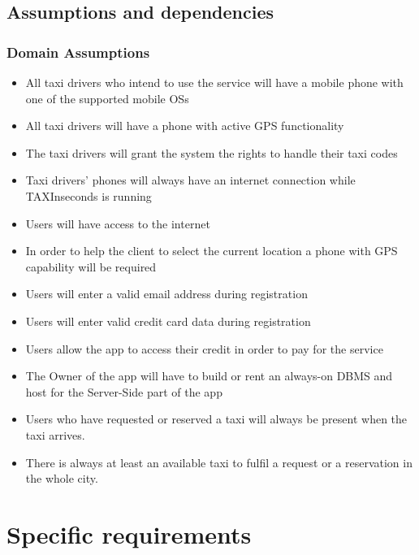\documentclass{article}
\begin{document}
\subsection{Assumptions and dependencies}
\subsubsection{Domain Assumptions}
\begin{itemize}
	\item All taxi drivers who intend to use the service will have a mobile phone with one of the supported mobile OSs
	\item All taxi drivers will have a phone with active GPS functionality 
	\item The taxi drivers will grant the system the rights to handle their taxi codes
	\item Taxi drivers' phones will always have an internet connection while TAXInseconds is running
	\item Users will have access to the internet
	\item In order to help the client to select the current location a phone with GPS capability will be required %
	\item Users will enter a valid email address during registration 
	\item Users will enter valid credit card data during registration
	\item Users allow the app to access their credit in order to pay for the service
	\item The Owner of the app will have to build or rent an always-on DBMS and host for the Server-Side part of the app %
	\item Users who have requested or reserved a taxi will always be present when the taxi arrives.
	\item There is always at least an available taxi to fulfil a request or a reservation in the whole city.
\end{itemize}
\clearpage
\section{Specific requirements}
\end{document}
